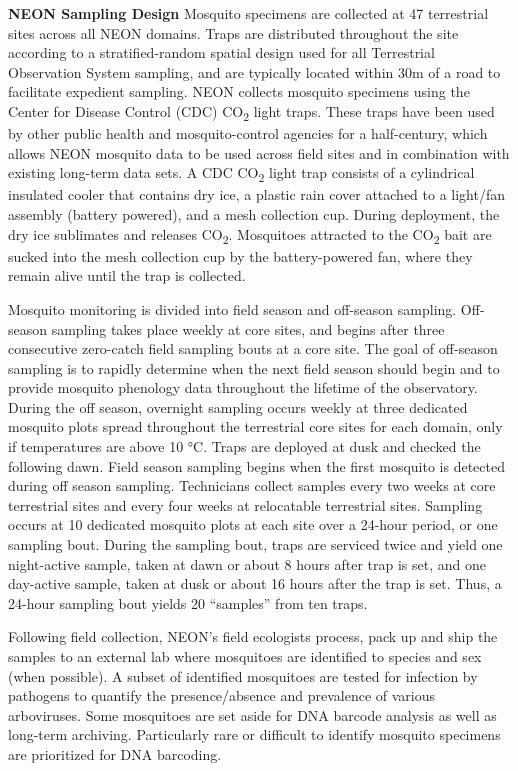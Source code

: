 \documentclass[
  12pt,
]{article}
\begin{document}
\textbf{NEON Sampling Design} Mosquito specimens are collected at 47 terrestrial sites across all NEON domains. Traps are distributed throughout the site according to a stratified-random spatial design used for all Terrestrial Observation System sampling, and are typically located within 30m of a road to facilitate expedient sampling. NEON collects mosquito specimens using the Center for Disease Control (CDC) CO\textsubscript{2} light traps. These traps have been used by other public health and mosquito-control agencies for a half-century, which allows NEON mosquito data to be used across field sites and in combination with existing long-term data sets. A CDC CO\textsubscript{2} light trap consists of a cylindrical insulated cooler that contains dry ice, a plastic rain cover attached to a light/fan assembly (battery powered), and a mesh collection cup. During deployment, the dry ice sublimates and releases CO\textsubscript{2}. Mosquitoes attracted to the CO\textsubscript{2} bait are sucked into the mesh collection cup by the battery-powered fan, where they remain alive until the trap is collected.

Mosquito monitoring is divided into field season and off-season sampling. Off-season sampling takes place weekly at core sites, and begins after three consecutive zero-catch field sampling bouts at a core site. The goal of off-season sampling is to rapidly determine when the next field season should begin and to provide mosquito phenology data throughout the lifetime of the observatory. During the off season, overnight sampling occurs weekly at three dedicated mosquito plots spread throughout the terrestrial core sites for each domain, only if temperatures are above 10 °C. Traps are deployed at dusk and checked the following dawn. Field season sampling begins when the first mosquito is detected during off season sampling. Technicians collect samples every two weeks at core terrestrial sites and every four weeks at relocatable terrestrial sites. Sampling occurs at 10 dedicated mosquito plots at each site over a 24-hour period, or one sampling bout. During the sampling bout, traps are serviced twice and yield one night-active sample, taken at dawn or about 8 hours after trap is set, and one day-active sample, taken at dusk or about 16 hours after the trap is set. Thus, a 24-hour sampling bout yields 20 ``samples'' from ten traps.

Following field collection, NEON's field ecologists process, pack up and ship the samples to an external lab where mosquitoes are identified to species and sex (when possible). A subset of identified mosquitoes are tested for infection by pathogens to quantify the presence/absence and prevalence of various arboviruses. Some mosquitoes are set aside for DNA barcode analysis as well as long-term archiving. Particularly rare or difficult to identify mosquito specimens are prioritized for DNA barcoding.
\end{document}
